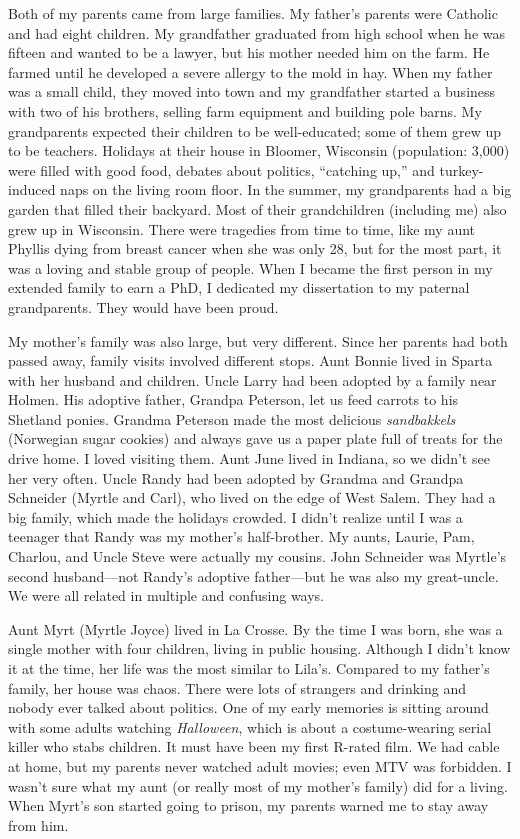 \documentclass[
  letterpaper,
]{book}
\begin{document}
Both of my parents came from large families. My father's parents were
Catholic and had eight children. My grandfather graduated from high
school when he was fifteen and wanted to be a lawyer, but his mother
needed him on the farm. He farmed until he developed a severe allergy to
the mold in hay. When my father was a small child, they moved into town
and my grandfather started a business with two of his brothers, selling
farm equipment and building pole barns. My grandparents expected their
children to be well-educated; some of them grew up to be teachers.
Holidays at their house in Bloomer, Wisconsin (population: 3,000) were
filled with good food, debates about politics, ``catching up,'' and
turkey-induced naps on the living room floor. In the summer, my
grandparents had a big garden that filled their backyard. Most of their
grandchildren (including me) also grew up in Wisconsin. There were
tragedies from time to time, like my aunt Phyllis dying from breast
cancer when she was only 28, but for the most part, it was a loving and
stable group of people. When I became the first person in my extended
family to earn a PhD, I dedicated my dissertation to my paternal
grandparents. They would have been proud.

My mother's family was also large, but very different. Since her parents
had both passed away, family visits involved different stops. Aunt
Bonnie lived in Sparta with her husband and children. Uncle Larry had
been adopted by a family near Holmen. His adoptive father, Grandpa
Peterson, let us feed carrots to his Shetland ponies. Grandma Peterson
made the most delicious \emph{sandbakkels} (Norwegian sugar cookies) and
always gave us a paper plate full of treats for the drive home. I loved
visiting them. Aunt June lived in Indiana, so we didn't see her very
often. Uncle Randy had been adopted by Grandma and Grandpa Schneider
(Myrtle and Carl), who lived on the edge of West Salem. They had a big
family, which made the holidays crowded. I didn't realize until I was a
teenager that Randy was my mother's half-brother. My aunts, Laurie, Pam,
Charlou, and Uncle Steve were actually my cousins. John Schneider was
Myrtle's second husband---not Randy's adoptive father---but he was also
my great-uncle. We were all related in multiple and confusing ways.

Aunt Myrt (Myrtle Joyce) lived in La Crosse. By the time I was born, she
was a single mother with four children, living in public housing.
Although I didn't know it at the time, her life was the most similar to
Lila's. Compared to my father's family, her house was chaos. There were
lots of strangers and drinking and nobody ever talked about politics.
One of my early memories is sitting around with some adults watching
\emph{Halloween}, which is about a costume-wearing serial killer who
stabs children. It must have been my first R-rated film. We had cable at
home, but my parents never watched adult movies; even MTV was forbidden.
I wasn't sure what my aunt (or really most of my mother's family) did
for a living. When Myrt's son started going to prison, my parents warned
me to stay away from him.
\end{document}
